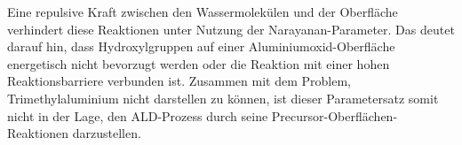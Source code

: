 Eine repulsive Kraft zwischen den Wassermolekülen und der Oberfläche verhindert diese Reaktionen unter Nutzung der Narayanan-Parameter.
Das deutet darauf hin, dass Hydroxylgruppen auf einer Aluminiumoxid-Oberfläche energetisch nicht bevorzugt werden oder die Reaktion mit einer hohen Reaktionsbarriere verbunden ist.
Zusammen mit dem Problem, Trimethylaluminium nicht darstellen zu können, ist dieser Parametersatz somit nicht in der Lage, den ALD-Prozess durch seine Precursor-Oberflächen-Reaktionen darzustellen.

